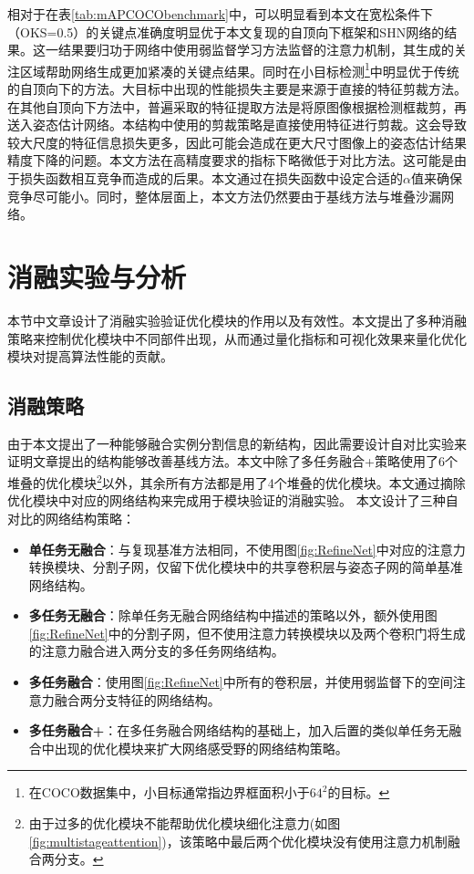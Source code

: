 相对于在表\ref{tab:mAPCOCObenchmark}中，可以明显看到本文在宽松条件下（OKS=0.5）的关键点准确度明显优于本文复现的自顶向下框架和SHN网络的结果。这一结果要归功于网络中使用弱监督学习方法监督的注意力机制，其生成的关注区域帮助网络生成更加紧凑的关键点结果。同时在小目标检测\footnote{在COCO数据集中，小目标通常指边界框面积小于$64^2$的目标。}中明显优于传统的自顶向下的方法。大目标中出现的性能损失主要是来源于直接的特征剪裁方法。在其他自顶向下方法中，普遍采取的特征提取方法是将原图像根据检测框裁剪，再送入姿态估计网络。本结构中使用的剪裁策略是直接使用特征进行剪裁。这会导致较大尺度的特征信息损失更多，因此可能会造成在更大尺寸图像上的姿态估计结果精度下降的问题。本文方法在高精度要求的指标下略微低于对比方法。这可能是由于损失函数相互竞争而造成的后果。本文通过在损失函数中设定合适的$\alpha$值来确保竞争尽可能小。同时，整体层面上，本文方法仍然要由于基线方法与堆叠沙漏网络。

\section{消融实验与分析}
\label{sec:ablation}
本节中文章设计了消融实验验证优化模块的作用以及有效性。本文提出了多种消融策略来控制优化模块中不同部件出现，从而通过量化指标和可视化效果来量化优化模块对提高算法性能的贡献。
\subsection{消融策略}
\label{subsec:selfstrategy}
由于本文提出了一种能够融合实例分割信息的新结构，因此需要设计自对比实验来证明文章提出的结构能够改善基线方法。本文中除了多任务融合+策略使用了6个堆叠的优化模块\footnote{由于过多的优化模块不能帮助优化模块细化注意力(如图\ref{fig:multistageattention})，该策略中最后两个优化模块没有使用注意力机制融合两分支。}以外，其余所有方法都是用了4个堆叠的优化模块。本文通过摘除优化模块中对应的网络结构来完成用于模块验证的消融实验。
本文设计了三种自对比的网络结构策略：
\begin{itemize}
	\item \textbf{单任务无融合}：与复现基准方法相同，不使用图\ref{fig:RefineNet}中对应的注意力转换模块、分割子网，仅留下优化模块中的共享卷积层与姿态子网的简单基准网络结构。
	\item \textbf{多任务无融合}：除单任务无融合网络结构中描述的策略以外，额外使用图\ref{fig:RefineNet}中的分割子网，但不使用注意力转换模块以及两个卷积门将生成的注意力融合进入两分支的多任务网络结构。
	\item \textbf{多任务融合}：使用图\ref{fig:RefineNet}中所有的卷积层，并使用弱监督下的空间注意力融合两分支特征的网络结构。
	\item \textbf{多任务融合+}：在多任务融合网络结构的基础上，加入后置的类似单任务无融合中出现的优化模块来扩大网络感受野的网络结构策略。
\end{itemize}

